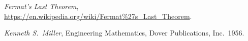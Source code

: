 \documentclass[SecEq,CM,GP]{degruyter-crelle} %
\theoremstyle{plain}
\theoremstyle{definition}
\begin{document}


\begin{thebibliography}{9}



\textit{Fermat's Last Theorem},
\url{https://en.wikipedia.org/wiki/Fermat%27s_Last_Theorem}.










\textit{Kenneth S.~Miller},
Engineering Mathematics, Dover Publications, Inc.\ 1956.




\end{thebibliography}
\end{document}
